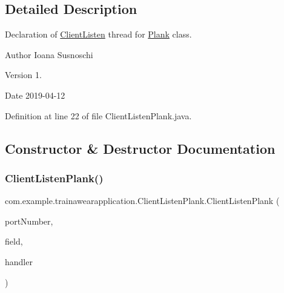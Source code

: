\subsection{Detailed Description}
Declaration of \mbox{\hyperlink{classcom_1_1example_1_1trainawearapplication_1_1_client_listen}{Client\+Listen}} thread for \mbox{\hyperlink{classcom_1_1example_1_1trainawearapplication_1_1_plank}{Plank}} class. 

\begin{DoxyAuthor}{Author}
Ioana Susnoschi 
\end{DoxyAuthor}
\begin{DoxyVersion}{Version}
1. 
\end{DoxyVersion}
\begin{DoxyDate}{Date}
2019-\/04-\/12 
\end{DoxyDate}


Definition at line 22 of file Client\+Listen\+Plank.\+java.



\subsection{Constructor \& Destructor Documentation}
\mbox{\label{classcom_1_1example_1_1trainawearapplication_1_1_client_listen_plank_af1cb478f41c794eaa377a1150009d070}} 
\subsubsection{\texorpdfstring{ClientListenPlank()}{ClientListenPlank()}}
{\footnotesize\ttfamily com.\+example.\+trainawearapplication.\+Client\+Listen\+Plank.\+Client\+Listen\+Plank (\begin{DoxyParamCaption}\item[{int}]{port\+Number,  }\item[{Text\+View}]{field,  }\item[{\mbox{\hyperlink{classcom_1_1example_1_1trainawearapplication_1_1_udp_client_handler_plank}{Udp\+Client\+Handler\+Plank}}}]{handler }\end{DoxyParamCaption})\hspace{0.3cm}{\ttfamily [inline]}}



